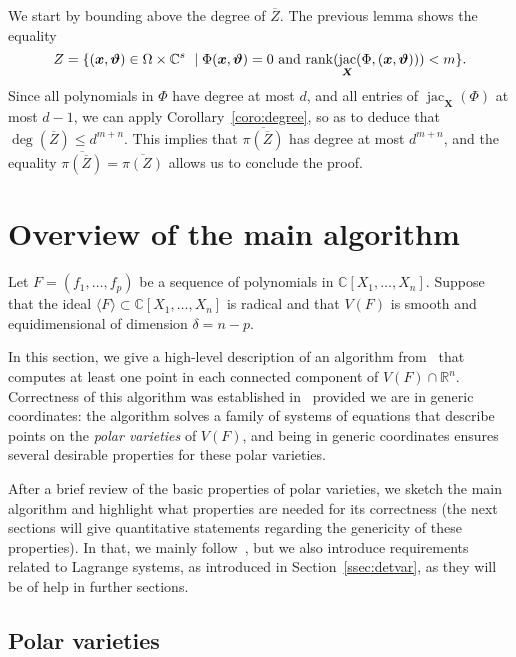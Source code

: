 \documentclass[12pt]{article}
\def\thetab{\bm{\vartheta}}
\def\xb{{\bm x}}
\DeclareMathOperator{\jac}{jac}
\def\dt{s}
\def\C{\mathbb{C}}
\def\R{\mathbb{R}}
\begin{document}
We start by bounding above the degree of $\overline{Z}$.
The previous lemma shows the equality
\[Z = \{ (\xb,\thetab) \in \Omega \times \C^\dt \ \mid \Phi(\xb,\thetab) =0
\text{~and~} {\rm rank}(\jac_{\bm X}(\Phi,(\xb,\thetab))) < m\}.\]
Since all polynomials in $\Phi$ have degree at most $d$, and all
entries of $\jac_{\bm X}(\Phi)$ at most $d-1$, we can apply
Corollary~\ref{coro:degree}, so as to deduce that $\deg(\overline{Z})
\le d^{m+n}$. This implies that $\overline{\pi(\overline Z)}$ has
degree at most $d^{m+n}$, and the equality $\overline{\pi(\overline
  Z)} =\overline{\pi(Z)}$ allows us to conclude the proof.


\section{Overview of the main algorithm}\label{sec:overview}

Let $F = (f_1,\hdots,f_p)$ be a sequence of polynomials in
$\C[X_1,\hdots,X_n]$. Suppose that the ideal $\langle F \rangle
\subset \C[X_1,\hdots,X_n]$ is radical and that $V(F)$ is smooth and
equidimensional of dimension $\delta= n-p$.

In this section, we give a high-level description of an algorithm
from~\cite{EMP} that computes at least one point in each connected
component of $V(F) \cap \R^n$. Correctness of this algorithm was
established in~\cite{EMP} provided we are in generic coordinates: the
algorithm solves a family of systems of equations that describe points
on the {\em polar varieties} of $V(F)$, and being in generic
coordinates ensures several desirable properties for these polar
varieties.

After a brief review of the basic properties of polar varieties, we
sketch the main algorithm and highlight what properties are needed for
its correctness (the next sections will give quantitative statements
regarding the genericity of these properties). In that, we mainly
follow~\cite{EMP}, but we also introduce requirements related to
Lagrange systems, as introduced in Section~\ref{ssec:detvar}, as they
will be of help in further sections.


\subsection{Polar varieties}
\end{document}
